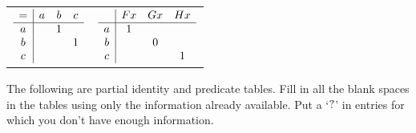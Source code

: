 \documentclass[PHIL101-Textbook.tex]{subfiles}
\begin{document}
\begin{earg}
\begin{tabular}{ll}
	$\begin{array}{c|ccc}
	   = & a & b & c\\ \hline
	   a & &1\\
	   b & & &1\\
	   c
	 \end{array}$
		 & 
	$\begin{array}{c|ccc}
	   & \mathord{F}{x} & \mathord{G}{x} & \mathord{H}{x}\\ \hline
	   a & 1& \\
	   b & &0\\
	   c & & &1
	 \end{array}$
  \end{tabular}
\end{earg}


\problempart
\label{pr.identity-predicate-relation-tables}

The following are partial identity and predicate tables. Fill in all the blank spaces in the tables using only the information already available. Put a `$?$' in entries for which you don't have enough information. 
\end{document}
